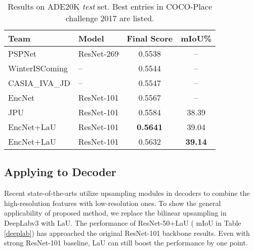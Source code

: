 \documentclass[10pt,twocolumn,letterpaper]{article}
\begin{document}
\begin{table}
  \caption{Results on ADE20K \textit{test} set. Best entries in COCO-Place challenge 2017 are listed.}
  \label{sample-table}
  \centering
\begin{tabular}{llcc}
\hline    
 Team & Model  & Final Score  & mIoU\%\\
\hline  \hline  
 PSPNet \cite{PSPNet} & ResNet-269 & 0.5538 & --\\
 WinterISComing & -- & 0.5544 & --\\
CASIA\_IVA\_JD & -- & 0.5547 & --\\
 EncNet \cite{EncNet} & ResNet-101 & 0.5567 & --\\
 JPU \cite{JPU} & ResNet-101 & 0.5584 & 38.39\\
 EncNet+LaU & ResNet-101 & \textbf{0.5641} & 39.04\\
 EncNet+LaU & ResNet-101 & 0.5632 & \textbf{39.14}\\
\hline  
  \end{tabular}
\label{ade20k_test}
\end{table}

\subsection{Applying to Decoder}
Recent state-of-the-arts \cite{ASPP, deeplabv3} utilize upsampling modules in decoders to combine the high-resolution features with low-resolution ones. To show the general applicability of proposed method, we replace the bilinear upsampling in DeepLabv3 \cite{deeplabv3} with LaU. The performance of ResNet-50+LaU ( mIoU in Table \ref{deeplab}) has approached the original ResNet-101 backbone results. Even with strong ResNet-101 baseline, LaU can still boost the performance by one point.
\end{document}

